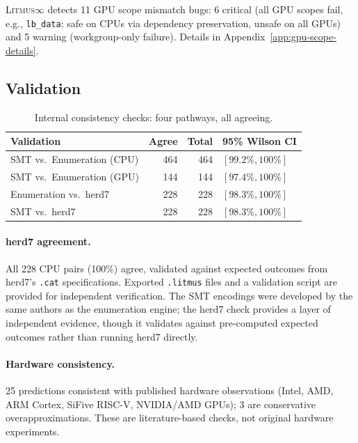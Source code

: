 \documentclass[11pt]{article}
\newcommand{\litmus}{\textsc{Litmus$\infty$}}
\begin{document}
\litmus{} detects 11 GPU scope mismatch bugs: 6 critical (all GPU
scopes fail, e.g., \texttt{lb\_data}: safe on CPUs via dependency
preservation, unsafe on all GPUs) and 5 warning (workgroup-only
failure). Details in Appendix~\ref{app:gpu-scope-details}.

\subsection{Validation}
\label{sec:validation}

\begin{table}[ht]
\centering
\caption{Internal consistency checks: four pathways, all agreeing.}
\label{tab:validation}
\small
\begin{tabular}{lrrl}
\toprule
\textbf{Validation} & \textbf{Agree} & \textbf{Total} & \textbf{95\% Wilson CI} \\
\midrule
SMT vs.\ Enumeration (CPU) & 464 & 464 & $[99.2\%, 100\%]$ \\
SMT vs.\ Enumeration (GPU) & 144 & 144 & $[97.4\%, 100\%]$ \\
Enumeration vs.\ herd7     & 228 & 228 & $[98.3\%, 100\%]$ \\
SMT vs.\ herd7             & 228 & 228 & $[98.3\%, 100\%]$ \\
\bottomrule
\end{tabular}
\end{table}

\paragraph{herd7 agreement.}
All 228 CPU pairs (100\%) agree, validated against expected outcomes
from herd7's \texttt{.cat} specifications.
Exported \texttt{.litmus} files and a validation script
are provided for independent verification.
The SMT encodings were developed by the same authors as the
enumeration engine; the herd7 check provides a layer of
independent evidence, though it validates against pre-computed
expected outcomes rather than running herd7 directly.

\paragraph{Hardware consistency.}
25 predictions consistent with published hardware observations
(Intel, AMD, ARM Cortex, SiFive RISC-V, NVIDIA/AMD GPUs);
3 are conservative overapproximations. These are literature-based
checks, not original hardware experiments.
\end{document}
